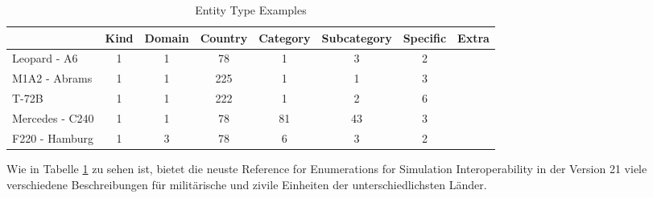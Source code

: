 \begin{table}[H]
	\centering
	
	\label{entity_examples}
	\begin{tabular}{|l|c|c|c|c|c|c|l|}
		\hline
		& \multicolumn{1}{l|}{Kind} & \multicolumn{1}{l|}{Domain} & \multicolumn{1}{l|}{Country} & \multicolumn{1}{l|}{Category} & \multicolumn{1}{l|}{Subcategory} & \multicolumn{1}{l|}{Specific} & Extra \\ \hline
		Leopard - A6    & 1                         & 1                           & 78                           & 1                             & 3                                & 2                             &       \\ \hline
		M1A2 - Abrams   & 1                         & 1                           & 225                          & 1                             & 1                                & 3                             &       \\ \hline
		T-72B           & 1                         & 1                           & 222                          & 1                             & 2                                & 6                             &       \\ \hline
		Mercedes - C240 & 1                         & 1                           & 78                           & 81                            & 43                               & 3                             &       \\ \hline
		F220 - Hamburg  & 1                         & 3                           & 78                           & 6                             & 3                                & 2                             &       \\ \hline
	
	\end{tabular}
\caption{Entity Type Examples}
\end{table}

Wie in Tabelle \ref{entity_examples} zu sehen ist, bietet die neuste  \glqq Reference for
Enumerations for Simulation Interoperability\grqq{} in der Version 21 \cite{Shanks.} viele verschiedene Beschreibungen für militärische und zivile Einheiten der unterschiedlichsten Länder.

